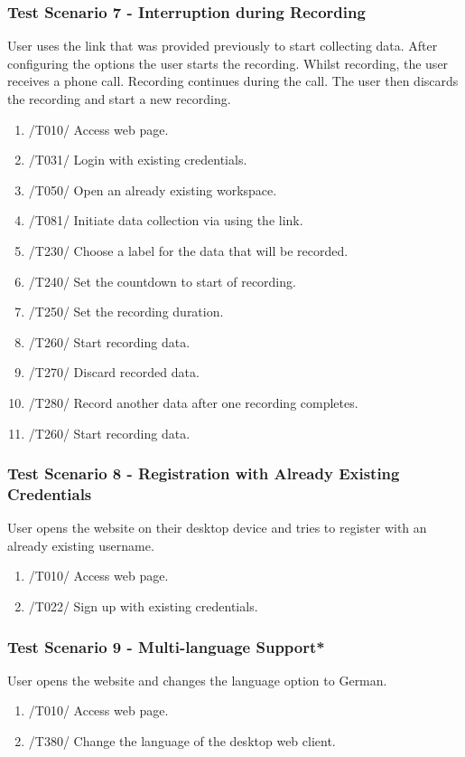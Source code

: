 \subsubsection{Test Scenario 7 - Interruption during Recording}
User uses the link that was provided previously to start collecting data. After configuring the options the user starts the recording. Whilst recording, the user receives a phone call. Recording continues during the call. The user then discards the recording and start a new recording. 
\begin{enumerate}
    \item /T010/ Access web page.
    \item /T031/ Login with existing credentials.
    \item /T050/ Open an already existing workspace.
    \item /T081/ Initiate data collection via using the link.
    \item /T230/ Choose a label for the data that will be recorded.
    \item /T240/ Set the countdown to start of recording.
    \item /T250/ Set the recording duration.
    \item /T260/ Start recording data.
    \item /T270/ Discard recorded data.
    \item /T280/ Record another data after one recording completes.
    \item /T260/ Start recording data.
\end{enumerate}
\subsubsection{Test Scenario 8 - Registration with Already Existing Credentials}
User opens the website on their desktop device and tries to register with an already existing username.
\begin{enumerate}
    \item /T010/ Access web page.
    \item /T022/ Sign up with existing credentials.
\end{enumerate}
\subsubsection{Test Scenario 9 - Multi-language Support*}
User opens the website and changes the language option to German. 
\begin{enumerate}
    \item /T010/ Access web page.
    \item /T380/ Change the language of the desktop web client.
\end{enumerate}
